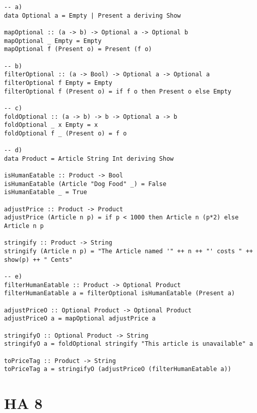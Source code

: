 \documentclass[a4paper]{article}
\begin{document}
\begin{lstlisting}
-- a)
data Optional a = Empty | Present a deriving Show

mapOptional :: (a -> b) -> Optional a -> Optional b
mapOptional _ Empty = Empty
mapOptional f (Present o) = Present (f o)

-- b)
filterOptional :: (a -> Bool) -> Optional a -> Optional a
filterOptional f Empty = Empty
filterOptional f (Present o) = if f o then Present o else Empty 

-- c)
foldOptional :: (a -> b) -> b -> Optional a -> b
foldOptional _ x Empty = x
foldOptional f _ (Present o) = f o

-- d)
data Product = Article String Int deriving Show

isHumanEatable :: Product -> Bool
isHumanEatable (Article "Dog Food" _) = False
isHumanEatable _ = True 

adjustPrice :: Product -> Product
adjustPrice (Article n p) = if p < 1000 then Article n (p*2) else Article n p

stringify :: Product -> String
stringify (Article n p) = "The Article named '" ++ n ++ "' costs " ++ show(p) ++ " Cents"

-- e)
filterHumanEatable :: Product -> Optional Product
filterHumanEatable a = filterOptional isHumanEatable (Present a)

adjustPriceO :: Optional Product -> Optional Product
adjustPriceO a = mapOptional adjustPrice a

stringifyO :: Optional Product -> String
stringifyO a = foldOptional stringify "This article is unavailable" a

toPriceTag :: Product -> String
toPriceTag a = stringifyO (adjustPriceO (filterHumanEatable a))
\end{lstlisting}

\pagebreak

\section*{ HA 8 }
\end{document}
